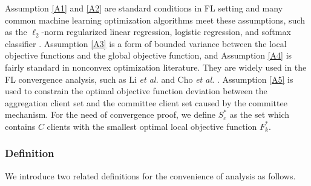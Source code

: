 \documentclass[10pt,journal,compsoc]{IEEEtran}
\newtheorem{definition}{Definition}
\newcommand{\etal}{\emph{et al.} }
\newcommand{\s}{S_a^{(t)}}
\begin{document}


Assumption \ref{A1} and \ref{A2} are standard conditions in FL setting\cite{9252927}\cite{9261995}\cite{9003425}\cite{amiri2020convergence} and many common machine learning optimization algorithms meet these assumptions, such as the $\ell_2$-norm regularized linear regression, logistic regression, and softmax classifier \cite{li2020convergence}. Assumption \ref{A3} is a form of bounded variance between the local objective functions and the global objective function\cite{8664630}, and Assumption \ref{A4} is fairly standard in nonconvex optimization literature\cite{pmlr-v48-reddi16}\cite{pmlr-v97-ward19a}\cite{9069945}\cite{9148862}. They are widely used in the FL convergence analysis, such as Li \etal \cite{li2020convergence} and Cho \etal \cite{cho2020client}. Assumption \ref{A5} is used to constrain the optimal objective function deviation between the aggregation client set and the committee client set caused by the committee mechanism. For the need of convergence proof, we define $S_c^*$ as the set which contains $C$ clients with the smallest optimal local objective function $F_k^*$. 

\subsubsection{Definition}\label{convergence_definition}

We introduce two related definitions for the convenience of analysis as follows.


\end{document}
